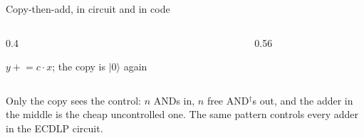 \documentclass[aspectratio=169,11pt]{beamer}
\newcommand{\code}[2][]{}
\begin{document}
\setcounter{framenumber}{81}
\begin{frame}[fragile]{Copy-then-add, in circuit and in code}
  \begin{columns}[c]
    \begin{column}{0.4\textwidth}
      \centering
      \par
      \vskip1mm
      {\scriptsize $y\mathrel{+}=c\cdot x$; the copy is $|0\rangle$ again}
    \end{column}
    \begin{column}{0.56\textwidth}
      \code[basicstyle=\ttfamily\scriptsize]{cadd.py}
    \end{column}
  \end{columns}
  \vskip3mm
  {\small Only the copy sees the control: $n$ ANDs in, $n$ free AND$^\dagger$s out, and the adder in the middle is the cheap uncontrolled one. The same pattern controls every adder in the ECDLP circuit.}
\end{frame}
\end{document}

